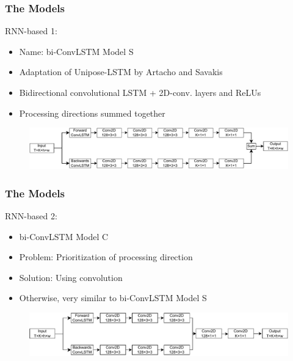 \documentclass{beamer}
\begin{document}
\begin{frame}
    \frametitle{The Models}
    RNN-based 1:
    \begin{itemize}
        \item<1-> Name: bi-ConvLSTM Model S
        \item<1-> Adaptation of Unipose-LSTM by Artacho and Savakis
        \item<1-> Bidirectional convolutional LSTM + 2D-conv. layers and ReLUs
        \item<1-> Processing directions summed together
    \end{itemize}
    \begin{figure}
        \centering
        \includegraphics[width = \textwidth]{../report/entities/bi_conv_lstm.pdf}
    \end{figure}
\end{frame}

\begin{frame}
    \frametitle{The Models}
    RNN-based 2:
    \begin{itemize}
        \item<1-> bi-ConvLSTM Model C
        \item<1-> Problem: Prioritization of processing direction
        \item<1-> Solution: Using convolution
        \item<1-> Otherwise, very similar to bi-ConvLSTM Model S
    \end{itemize}
    \begin{figure}
        \centering
        \includegraphics[width = \textwidth]{../report/entities/unipose2.pdf}
    \end{figure}
\end{frame}
\end{document}
